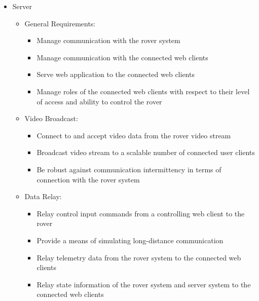 \begin{itemize}
        \item Server
        \begin{itemize}
          \item General Requirements:
          \begin{itemize}
            \item Manage communication with the rover system
            \item Manage communication with the connected web clients
            \item Serve web application to the connected web clients
            \item Manage roles of the connected web clients with respect to their level of access and ability to control the rover
          \end{itemize}
          \item Video Broadcast:
          \begin{itemize}
            \item Connect to and accept video data from the rover video stream
            \item Broadcast video stream to a scalable number of connected user clients
            \item Be robust against communication intermittency in terms of connection with the rover system
          \end{itemize}
          \item Data Relay:
          \begin{itemize}
            \item Relay control input commands from a controlling web client to the rover
            \item Provide a means of simulating long-distance communication 
            \item Relay telemetry data from the rover system to the connected web clients
            \item Relay state information of the rover system and server system to the connected web clients
          \end{itemize}
        \end{itemize}
          

\end{itemize}
